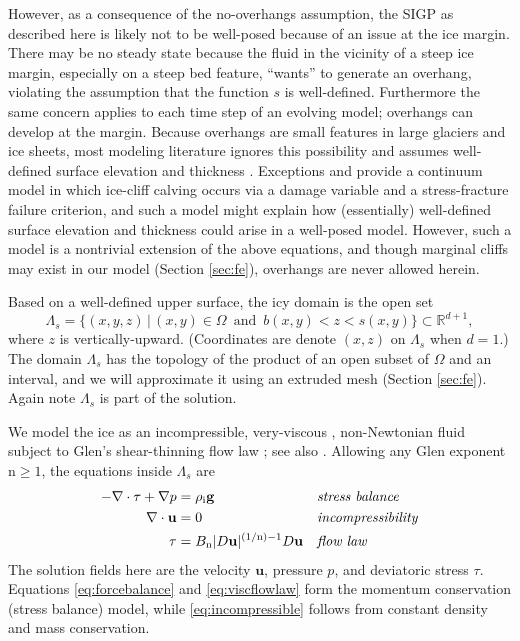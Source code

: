 \documentclass[letterpaper,final,12pt,reqno]{amsart}
\theoremstyle{claim}
\newcommand{\RR}{\mathbb{R}}
\newcommand{\bg}{\mathbf{g}}
\newcommand{\bu}{\mathbf{u}}
\newcommand{\rhoi}{\rho_{\text{i}}}
\newcommand{\nn}{{\text{n}}}
\numberwithin{equation}{section}
\numberwithin{figure}{section}
\numberwithin{table}{section}
\numberwithin{theorem}{section}
\begin{document}
However, as a consequence of the no-overhangs assumption, the SIGP as described here is likely not to be well-posed because of an issue at the ice margin.  There may be no steady state because the fluid in the vicinity of a steep ice margin, especially on a steep bed feature, ``wants'' to generate an overhang, violating the assumption that the function $s$ is well-defined.  Furthermore the same concern applies to each time step of an evolving model; overhangs can develop at the margin.  Because overhangs are small features in large glaciers and ice sheets, most modeling literature ignores this possibility and assumes well-defined surface elevation and thickness \cite{Jouvetetal2008,Lengetal2012,WirbelJarosch2020}.  Exceptions \cite{PralongFunk2005} and \cite{Jouvetetal2011} provide a continuum model in which ice-cliff calving occurs via a damage variable and a stress-fracture failure criterion, and such a model might explain how (essentially) well-defined surface elevation and thickness could arise in a well-posed model.  However, such a model is a nontrivial extension of the above equations, and though marginal cliffs may exist in our model (Section \ref{sec:fe}), overhangs are never allowed herein.

Based on a well-defined upper surface, the icy domain is the open set
\begin{equation}
\Lambda_s = \{(x,y,z)\,|\,(x,y) \in \Omega \,\text{ and }\, b(x,y) < z < s(x,y)\}  \subset \RR^{d+1}, \label{eq:lambdas}
\end{equation}
where $z$ is vertically-upward.  (Coordinates are denote $(x,z)$ on $\Lambda_s$ when $d=1$.)  The domain $\Lambda_s$ has the topology of the product of an open subset of $\Omega$ and an interval, and we will approximate it using an extruded mesh (Section \ref{sec:fe}).  Again note $\Lambda_s$ is part of the solution.

We model the ice as an incompressible, very-viscous \cite{Acheson1990}, non-Newtonian fluid subject to Glen's shear-thinning flow law \cite{GreveBlatter2009}; see also \cite[Chapter 1]{FowlerNg2021}.  Allowing any Glen exponent $\nn\ge 1$, the equations inside $\Lambda_s$ are
\begin{align}
- \nabla \cdot \tau + \nabla p &= \rhoi \bg &&\text{\emph{stress balance}} \label{eq:forcebalance} \\
\nabla \cdot \bu &= 0 &&\text{\emph{incompressibility}} \label{eq:incompressible} \\
\tau &= B_\nn |D\bu|^{(1/\nn) - 1} D\bu  &&\text{\emph{flow law}} \label{eq:viscflowlaw}
\end{align}
The solution fields here are the velocity $\bu$, pressure $p$, and deviatoric stress $\tau$.  Equations \eqref{eq:forcebalance} and \eqref{eq:viscflowlaw} form the momentum conservation (stress balance) model, while \eqref{eq:incompressible} follows from constant density and mass conservation.
\end{document}
